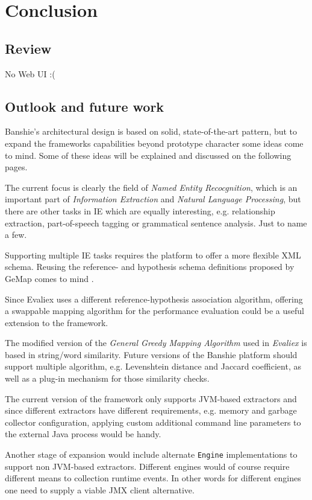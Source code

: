 \section{Conclusion}
\label{sec:conclusion}

\subsection{Review}
No Web UI :(

\subsection{Outlook and future work}
Banshie's architectural design is based on solid, state-of-the-art pattern, but to expand the frameworks capabilities beyond prototype character some ideas come to mind. Some of these ideas will be explained and discussed on the following pages.

The current focus is clearly the field of \textit{Named Entity Recocgnition}, which is an important part of \textit{Information Extraction} and \textit{Natural Language Processing}, but there are other tasks in \gls{IE} which are equally interesting, e.g. relationship extraction, part-of-speech tagging or grammatical sentence analysis. Just to name a few.

Supporting multiple \gls{IE} tasks requires the platform to offer a more flexible XML schema. Reusing the reference- and hypothesis schema definitions proposed by GeMap comes to mind \cite{Linsmayr:2010b}.

Since Evaliex uses a different reference-hypothesis association algorithm, offering a swappable mapping algorithm for the performance evaluation could be a useful extension to the framework.

The modified version of the \textit{General Greedy Mapping Algorithm} used in \textit{Evaliex} is based in string/word similarity. Future versions of the Banshie platform should support multiple algorithm, e.g. Levenshtein distance and Jaccard coefficient, as well as a plug-in mechanism for those similarity checks.

The current version of the framework only supports \gls{JVM}-based extractors and since different extractors have different requirements, e.g. memory and garbage collector configuration, applying custom additional command line parameters to the external Java process would be handy.

Another stage of expansion would include alternate \texttt{Engine} implementations to support non \gls{JVM}-based extractors. Different engines would of course require different means to collection runtime events. In other words for different engines one need to supply a viable \gls{JMX} client alternative.


